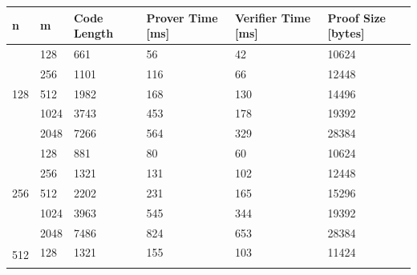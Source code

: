 \begin{table}[h!]
\centering
\begin{tabular}{|c|m{4em}|m{4em}|m{4em}|m{4em}|m{5em}|}
\hline

\multicolumn{1}{|l|}{n}                     & m   & Code Length  & Prover Time {[}ms{]} & Verifier Time {[}ms{]} & Proof Size {[}bytes{]} \\ \hline\hline
\multirow{5}{*}{128}                        & 128 & 661 & 56                   & 42                     & 10624                                         \\ \cline{2-6} 
                                            & 256 & 1101 & 116                  & 66                     & 12448                                         \\ \cline{2-6} 
                                            & 512 & 1982 & 168                  & 130                    & 14496                                         \\ \cline{2-6} 
                                            & 1024 & 3743 & 453                  & 178                    & 19392                                         \\ \cline{2-6} 
                                            & 2048 & 7266 & 564                  & 329                    & 28384                                         \\ \hline
\multirow{5}{*}{256}                        & 128  & 881 & 80                   & 60                     & 10624                                         \\ \cline{2-5} 
                                            & 256  & 1321 & 131                  & 102                    & 12448                                         \\ \cline{2-6} 
                                            & 512  & 2202 & 231                  & 165                    & 15296                                         \\ \cline{2-6} 
                                            & 1024 & 3963 & 545                  & 344                    & 19392                                         \\ \cline{2-6} 
                                            & 2048 & 7486 & 824                  & 653                    & 28384                                         \\ \hline
\multirow{5}{*}{512}                        & 128  & 1321 & 155                  & 103                    & 11424                                         \\ \cline{2-6} 

\end{tabular}
\end{table}
